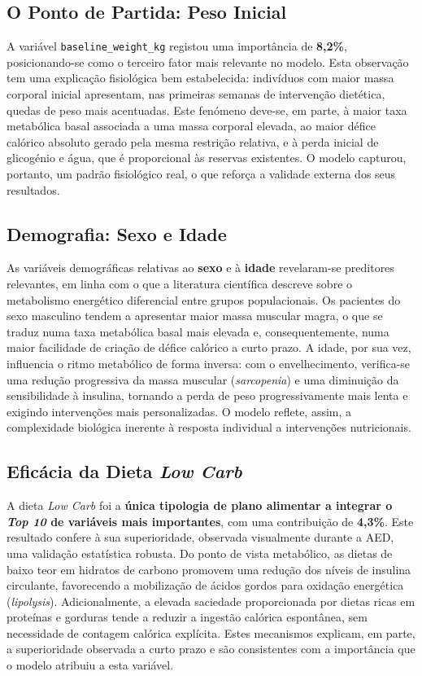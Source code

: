 \subsection{O Ponto de Partida: Peso Inicial}

A variável \texttt{baseline\_weight\_kg} registou uma importância de \textbf{8,2\%}, posicionando-se como o terceiro fator mais relevante no modelo. Esta observação tem uma explicação fisiológica bem estabelecida: indivíduos com maior massa corporal inicial apresentam, nas primeiras semanas de intervenção dietética, quedas de peso mais acentuadas. Este fenómeno deve-se, em parte, à maior taxa metabólica basal associada a uma massa corporal elevada, ao maior défice calórico absoluto gerado pela mesma restrição relativa, e à perda inicial de glicogénio e água, que é proporcional às reservas existentes. O modelo capturou, portanto, um padrão fisiológico real, o que reforça a validade externa dos seus resultados.

\subsection{Demografia: Sexo e Idade}

As variáveis demográficas relativas ao \textbf{sexo} e à \textbf{idade} revelaram-se preditores relevantes, em linha com o que a literatura científica descreve sobre o metabolismo energético diferencial entre grupos populacionais. Os pacientes do sexo masculino tendem a apresentar maior massa muscular magra, o que se traduz numa taxa metabólica basal mais elevada e, consequentemente, numa maior facilidade de criação de défice calórico a curto prazo. A idade, por sua vez, influencia o ritmo metabólico de forma inversa: com o envelhecimento, verifica-se uma redução progressiva da massa muscular (\textit{sarcopenia}) e uma diminuição da sensibilidade à insulina, tornando a perda de peso progressivamente mais lenta e exigindo intervenções mais personalizadas. O modelo reflete, assim, a complexidade biológica inerente à resposta individual a intervenções nutricionais.

\subsection{Efic\'acia da Dieta \textit{Low Carb}}

A dieta \textit{Low Carb} foi a \textbf{única tipologia de plano alimentar a integrar o \textit{Top 10} de variáveis mais importantes}, com uma contribuição de \textbf{4,3\%}. Este resultado confere à sua superioridade, observada visualmente durante a AED, uma validação estatística robusta. Do ponto de vista metabólico, as dietas de baixo teor em hidratos de carbono promovem uma redução dos níveis de insulina circulante, favorecendo a mobilização de ácidos gordos para oxidação energética (\textit{lipolysis}). Adicionalmente, a elevada saciedade proporcionada por dietas ricas em proteínas e gorduras tende a reduzir a ingestão calórica espontânea, sem necessidade de contagem calórica explícita. Estes mecanismos explicam, em parte, a superioridade observada a curto prazo e são consistentes com a importância que o modelo atribuiu a esta variável.

